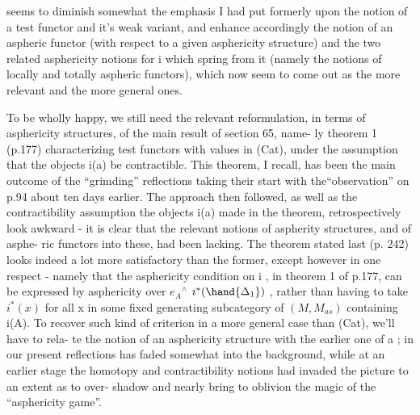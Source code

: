 
seems to diminish somewhat the  emphasis I had put formerly upon the
notion of a test functor and it's weak variant, and enhance accordingly
the notion of an aspheric functor (with respect to a given asphericity
structure) and the two related asphericity notions for i which spring
from it (namely the notions of locally and  totally aspheric functors),
which now seem to come out as the more relevant and the more general ones.

To be wholly happy, we still need the relevant reformulation, in
terms of asphericity structures, of the main result of section 65, name-%
ly theorem 1 (p.177) characterizing test functors with values in (Cat),
under the assumption that the objects i(a) be contractible. This theorem,
I recall, has been the main outcome of the ``grimding'' reflections taking
their start with the``observation'' on p.94 about ten days earlier. The
approach then followed, as well as the contractibility assumption  the
objects i(a) made in the theorem, retrospectively look awkward - it is
clear that the relevant notions of aspherity structures, and of asphe-%
ric functors into these, had been lacking. The theorem stated last
(p. 242) looks indeed a lot more satisfactory than the former, except
however in one respect - namely that the asphericity condition on i ,
in theorem 1 of p.177, can be expressed  by asphericity over $e_{A}{}^{\wedge}$ \hand{\uline{\textcolor{black}{of}}}
\hand{\uline{\textcolor{black}{just}}} $i^{*}(\hand{\Delta_{1}})$ \hand{\uline{\textcolor{black}{alone}}}, rather than having to take $i^{*}(x)$ for all x in some
fixed generating subcategory of $(M,M_{as})$ containing i(A). To recover such
kind of  criterion in a more general case than (Cat), we'll have to rela-%
te the notion of an asphericity structure with the earlier one of a
\hand{\uline{\textcolor{black}{contractibility}}} \hand{\uline{\textcolor{black}{structure}}} ;    in our present reflections has faded
somewhat into the background, while at an earlier stage the homotopy and
contractibility notions had invaded the picture to an extent as to over-%
shadow and nearly bring to oblivion the magic of the ``asphericity game''.

